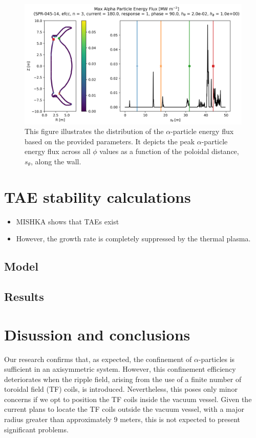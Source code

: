 \documentclass[10pt, a4paper, twoside]{article}
\begin{document}
\begin{figure}[!htb]
    \centering
    \includegraphics[width=0.7\linewidth]{Figures/simple_line_plot_no_confidence_band.png}
    \caption{This figure illustrates the distribution of the $\alpha$-particle energy flux based on the provided parameters. It depicts the peak $\alpha$-particle energy flux across all $\phi$ values as a function of the poloidal distance, $s_\theta$, along the wall.}
    \label{fig:energy_flux_distribution}
\end{figure}

\section{TAE stability calculations}
\label{sec:halo_work}

\begin{itemize}
    \item MISHKA shows that TAEs exist
    \item However, the growth rate is completely suppressed by the thermal plasma. 
\end{itemize}

\subsection{Model}

\subsection{Results}

\section{Disussion and conclusions}
\label{sec:discussion_and_conclusions}

Our research confirms that, as expected, the confinement of $\alpha$-particles is sufficient in an axisymmetric system. However, this confinement efficiency deteriorates when the ripple field, arising from the use of a finite number of toroidal field (TF) coils, is introduced. Nevertheless, this poses only minor concerns if we opt to position the TF coils inside the vacuum vessel. Given the current plans to locate the TF coils outside the vacuum vessel, with a major radius greater than approximately 9 meters, this is not expected to present significant problems.
\end{document}

